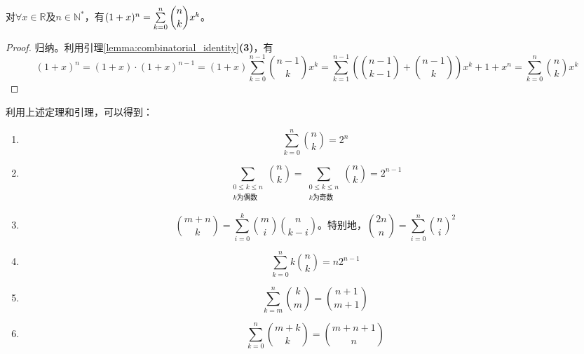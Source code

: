         \begin{theorem}[二项式定理]
            对$\forall x\in \mathbb{R}$及$n\in \mathbb{N}^*$，有$(1+x)^n=\sum\limits_{k=0}^{n}\dbinom{n}{k}x^{k}$。
        \end{theorem}

        \begin{proof}
            归纳。利用引理\ref{lemma:combinatorial_identity}\textbf{(3)}，有
            \begin{equation*}
                (1+x)^n=(1+x)\cdot(1+x)^{n-1}=(1+x)\sum_{k=0}^{n-1}\binom{n-1}{k}x^{k}=\sum_{k=1}^{n-1}\left(\binom{n-1}{k-1}+\binom{n-1}{k}\right)x^{k}+1+x^n=\sum_{k=0}^{n}\binom{n}{k}x^{k}
            \end{equation*}
        \end{proof}

        \begin{corollary}
            利用上述定理和引理，可以得到：
            \begin{enumerate}
                \item
                    \begin{equation*}
                        \sum_{k=0}^{n}\binom{n}{k}=2^{n}
                    \end{equation*}
                \item
                    \begin{equation*}
                        \sum_{\substack{0\leq k\leq n \\ k\text{为偶数}}}\binom{n}{k}=\sum_{\substack{0\leq k\leq n \\ k\text{为奇数}}}\binom{n}{k}=2^{n-1}
                    \end{equation*}
                \item
                    \begin{equation*}
                        \binom{m+n}{k}=\sum_{i=0}^{k}\binom{m}{i}\binom{n}{k-i}\text{。特别地，}\binom{2n}{n}=\sum_{i=0}^{n}\binom{n}{i}^{2}
                    \end{equation*}
                \item
                    \begin{equation*}
                        \sum_{k=0}^{n}k\binom{n}{k}=n2^{n-1}
                    \end{equation*}
                \item
                    \begin{equation*}
                        \sum_{k=m}^{n}\binom{k}{m}=\binom{n+1}{m+1}
                    \end{equation*}
                \item
                    \begin{equation*}
                        \sum_{k=0}^{n}\binom{m+k}{k}=\binom{m+n+1}{n}
                    \end{equation*}
            \end{enumerate}
        \end{corollary}


